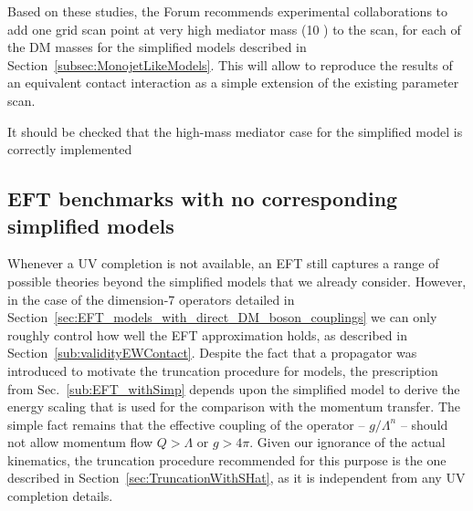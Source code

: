 \vskip20pt
	
Based on these studies, the Forum recommends experimental collaborations to 
add one grid scan point at very high mediator mass (10 \tev) to the scan, 
for each of the DM masses for the \schannel simplified models described in Section~\ref{subsec:MonojetLikeModels}. 
This will allow to reproduce the results of an equivalent contact interaction
as a simple extension of the existing parameter scan. 

It should be checked that the high-mass mediator case for the simplified model is correctly implemented 


\subsection{EFT benchmarks with no corresponding simplified models}


Whenever a UV completion is not available, an EFT still
captures a range of possible theories beyond the simplified models that we already consider. 
However, in the case of the dimension-7 operators detailed in Section~\ref{sec:EFT_models_with_direct_DM_boson_couplings}
we can only roughly control how well the EFT approximation holds, as described in Section~\ref{sub:validityEWContact}.
Despite the fact that a propagator was introduced to motivate
the truncation procedure for \schannel models, the prescription from Sec.~\ref{sub:EFT_withSimp}
depends upon the simplified model to derive the
energy scaling that is used for the comparison with the momentum transfer. 
The simple fact remains that the effective
coupling of the operator -- $g/\Lambda^n$ -- should not allow
momentum flow $Q>\Lambda$ or $g>4\pi$.  Given our ignorance of
the actual kinematics, 
the truncation procedure recommended for this purpose
is the one described in Section~\ref{sec:TruncationWithSHat},
as it is independent from any UV completion details. 

